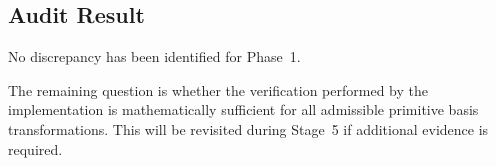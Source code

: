 \subsection{Audit Result}

No discrepancy has been identified for Phase~1.

The remaining question is whether the verification performed by the
implementation is mathematically sufficient for all admissible primitive
basis transformations. This will be revisited during Stage~5 if
additional evidence is required.

